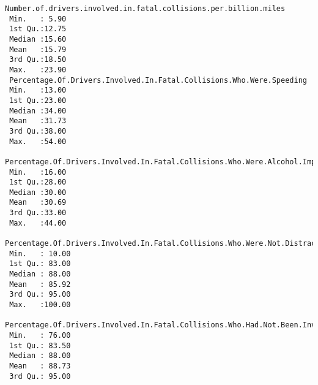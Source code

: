 \begin{Verbatim}[commandchars=\\\{\}]
 Number.of.drivers.involved.in.fatal.collisions.per.billion.miles
 Min.   : 5.90                                                   
 1st Qu.:12.75                                                   
 Median :15.60                                                   
 Mean   :15.79                                                   
 3rd Qu.:18.50                                                   
 Max.   :23.90                                                   
 Percentage.Of.Drivers.Involved.In.Fatal.Collisions.Who.Were.Speeding
 Min.   :13.00                                                       
 1st Qu.:23.00                                                       
 Median :34.00                                                       
 Mean   :31.73                                                       
 3rd Qu.:38.00                                                       
 Max.   :54.00                                                       
 Percentage.Of.Drivers.Involved.In.Fatal.Collisions.Who.Were.Alcohol.Impaired
 Min.   :16.00                                                               
 1st Qu.:28.00                                                               
 Median :30.00                                                               
 Mean   :30.69                                                               
 3rd Qu.:33.00                                                               
 Max.   :44.00                                                               
 Percentage.Of.Drivers.Involved.In.Fatal.Collisions.Who.Were.Not.Distracted
 Min.   : 10.00                                                            
 1st Qu.: 83.00                                                            
 Median : 88.00                                                            
 Mean   : 85.92                                                            
 3rd Qu.: 95.00                                                            
 Max.   :100.00                                                            
 Percentage.Of.Drivers.Involved.In.Fatal.Collisions.Who.Had.Not.Been.Involved.In.Any.Previous.Accidents
 Min.   : 76.00                                                                                        
 1st Qu.: 83.50                                                                                        
 Median : 88.00                                                                                        
 Mean   : 88.73                                                                                        
 3rd Qu.: 95.00                                                                                        

\end{Verbatim}
